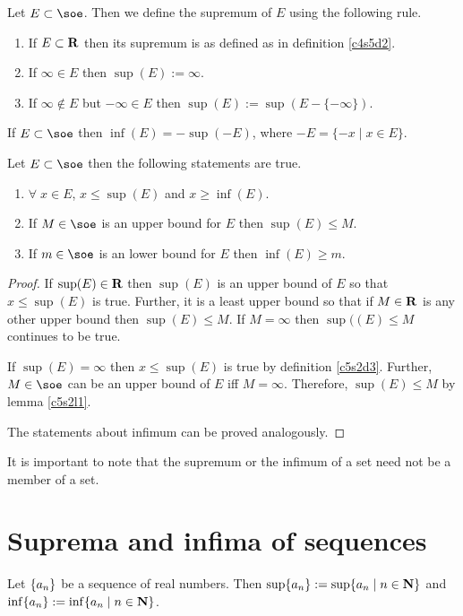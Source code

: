 \begin{defn}\label{c5s2d4}
Let $E \subset \soe$. Then we define the supremum of $E$ using the following
rule.
\begin{enumerate}
\item If $E \subset \mathbf{R}$ then its supremum is as defined as in definition 
\ref{c4s5d2}.
\item If $\infty \in E$ then $\sup(E) := \infty$.
\item If $\infty \notin E$ but $-\infty \in E$ then $\sup(E) := 
\sup(E - \{-\infty\})$.
\end{enumerate}
\end{defn}

\begin{defn}\label{c5s2d5}
If $E \subset \soe$ then $\inf(E) = -\sup(-E)$, where $-E = \{-x \;|\; x
\in E\}$.
\end{defn}

\begin{thm}\label{c5s2t1}
Let $E \subset \soe$ then the following statements are true.
\begin{enumerate}
\item $\forall\; x \in E$, $x \le \sup(E)$ and $x \ge \inf(E)$.
\item If $M \in \soe$ is an upper bound for $E$ then $\sup(E) \le M$.
\item If $m \in \soe$ is an lower bound for $E$ then $\inf(E) \ge m$.
\end{enumerate}
\end{thm}
\begin{proof}
If $\sup(E) \in \mathbf{R}$ then $\sup(E)$ is an upper bound of $E$ so that
$x \le \sup(E)$ is true. Further, it is a least upper bound so that if
$M \in \mathbf{R}$ is any other upper bound then $\sup(E) \le M$. If $M = \infty$
then $\sup((E) \le M$ continues to be true.

If $\sup(E) = \infty$ then $x \le \sup(E)$ is true by definition 
\ref{c5s2d3}. Further, $M \in \soe$ can be an upper bound of $E$ iff $M =
\infty$. Therefore, $\sup(E) \le M$ by lemma \ref{c5s2l1}.

The statements about infimum can be proved analogously.
\end{proof}

It is important to note that the supremum or the infimum of a set need not
be a member of a set.

\section{Suprema and infima of sequences}\label{c5s3}
\begin{defn}\label{c5s3d1}
Let $\{a_n\}$ be a sequence of real numbers. Then $\sup\{a_n\} :=
\sup\{a_n \;|\; n \in \mathbf{N}\}$ and $\inf\{a_n\} := \inf\{a_n \;|\; n 
\in \mathbf{N}\}$.
\end{defn}

